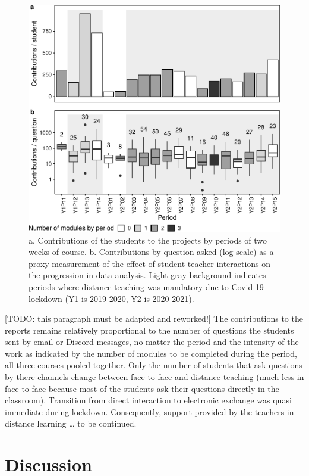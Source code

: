 \documentclass[
]{article}
\begin{document}
\begin{figure}
\centering
\includegraphics{teaching_data_science_files/figure-latex/fig_support_by_time-1.pdf}
\caption{a. Contributions of the students to the projects by periods of
two weeks of course. b. Contributions by question asked (log scale) as a
proxy measurement of the effect of student-teacher interactions on the
progression in data analysis. Light gray background indicates periods
where distance teaching was mandatory due to Covid-19 lockdown (Y1 is
2019-2020, Y2 is 2020-2021).}
\end{figure}

{[}TODO: this paragraph must be adapted and reworked!{]} The
contributions to the reports remains relatively proportional to the
number of questions the students sent by email or Discord messages, no
matter the period and the intensity of the work as indicated by the
number of modules to be completed during the period, all three courses
pooled together. Only the number of students that ask questions by there
channels change between face-to-face and distance teaching (much less in
face-to-face because most of the students ask their questions directly
in the classroom). Transition from direct interaction to electronic
exchange was quasi immediate during lockdown. Consequently, support
provided by the teachers in distance learning \ldots{} to be continued.

\hypertarget{discussion}{%
\section{Discussion}\label{discussion}}
\end{document}
